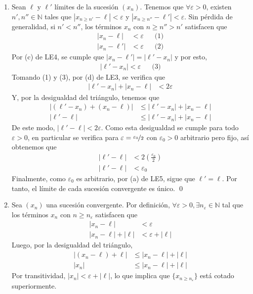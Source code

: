 \documentclass[11pt]{article}
\newcommand{\N}{\mathbb{N}}
\let\epsilon\varepsilon
\begin{document}
\begin{enumerate}[label=\alph*)]
    \item Sean $\ell$ y $\ell'$ límites de la sucesión $(x_n)$. Tenemos que $\forall \varepsilon>0$, existen $n',n'' \in \N$ tales que $|x_{n\geq n'}-\ell|<\varepsilon$ y $|x_{n\geq n''}-\ell'|<\varepsilon$. Sin pérdida de generalidad, si $n'<n''$, los términos $x_n$ con $n\geq n''>n'$ satisfacen que \begin{align*}
        |x_n-\ell| &<\varepsilon && \text{(1)}\\
        |x_n-\ell'| &<\varepsilon && \text{(2)}
    \end{align*}
    Por (c) de LE4, se cumple que $|x_n-\ell'|=|\ell'-x_n|$ y por esto, \begin{align*}
        |\ell'-x_n|<\varepsilon && \text{(3)}
    \end{align*}
    Tomando (1) y (3), por (d) de LE3, se verifica que \begin{align*}
        |\ell'-x_n| + |x_n-\ell| &< 2\varepsilon
    \end{align*}
    Y, por la desigualdad del triángulo, tenemos que \begin{align*}
        \big|(\ell'-x_n)+(x_n-\ell)\big| &\leq |\ell'-x_n| + |x_n-\ell|\\
        |\ell'-\ell| &\leq |\ell'-x_n| + |x_n-\ell|
    \end{align*}
    De este modo, $|\ell'-\ell| < 2\varepsilon$. Como esta desigualdad se cumple para todo $\varepsilon>0$, en particular se verifica para $\varepsilon=\nicefrac{\varepsilon_0}{2}$ con $\varepsilon_0>0$ arbitrario pero fijo, así obtenemos que \begin{align*}
        |\ell'-\ell| &< 2 \left(\frac{\varepsilon_0}{2}\right)\\
        |\ell'-\ell| &< \varepsilon_0
    \end{align*}
    Finalmente, como $\varepsilon_0$ es arbitrario, por (a) de LE5, sigue que $\ell'=\ell$. Por tanto, el límite de cada sucesión convergente es único. \qed
%
    \item Sea $(x_n)$ una sucesión convergente. Por definición, $\forall \epsilon>0, \exists n_\varepsilon \in \N$ tal que los términos $x_n$ con $n\geq n_\varepsilon$ satisfacen que \begin{align*}
        |x_n - \ell| &< \epsilon \\
        |x_n - \ell| + |\ell| &< \epsilon + |\ell|
    \end{align*}
    Luego, por la desigualdad del triángulo, \begin{align*}
        \big|(x_n-\ell)+\ell\big| &\leq |x_n-\ell| + |\ell|\\
        |x_n| &\leq |x_n-\ell| + |\ell|
    \end{align*}
    Por transitividad, $|x_n|< \epsilon + |\ell|$, lo que implica que $\{x_{n\geq n_\varepsilon}\}$ está cotado superiormente.
    

\end{enumerate}
\end{document}
